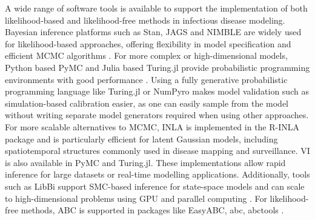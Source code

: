 \documentclass{article}
\begin{document}
A wide range of software tools is available to support the implementation of both likelihood-based and likelihood-free methods in infectious disease modeling. Bayesian inference platforms such as Stan, JAGS and NIMBLE are widely used for likelihood-based approaches, offering flexibility in model specification and efficient MCMC algorithms \citep{carpenter2017stan,abril2023pymc}. For more complex or high-dimensional models, Python based PyMC and Julia based Turing.jl provide probabilistic programming environments with good performance \citep{abril2023pymc,ge2018turing,fjelde2025turing}. Using a fully generative probabilistic programming language like Turing.jl or NumPyro makes model validation such as simulation-based calibration easier, as one can easily sample from the model without writing separate model generators required when using other approaches. For more scalable alternatives to MCMC, INLA is implemented in the R-INLA package \citep{martins2013bayesian} and is particularly efficient for latent Gaussian models, including spatiotemporal structures commonly used in disease mapping and surveillance. VI is also available in PyMC and Turing.jl. These implementations allow rapid inference for large datasets or real-time modelling applications.  Additionally, tools such as LibBi support SMC-based inference for state-space models and can scale to high-dimensional problems using GPU and parallel computing \citep{murray2015bayesian}. For likelihood-free methods, ABC is supported in packages like EasyABC, abc, abctools \citep{jabot2013easy,csillery2012abc,nunes2015abctools}.
\end{document}
